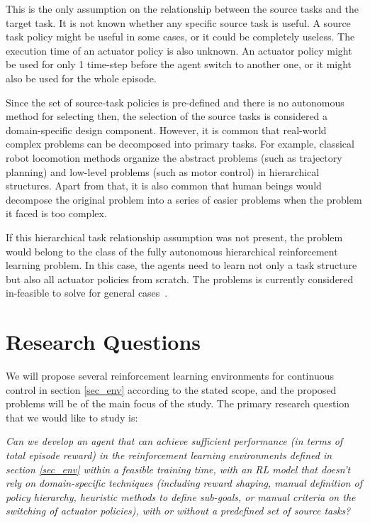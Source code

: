 This is the only assumption on the relationship between the source tasks and the target task. It is not known whether any specific source task is useful. A source task policy might be useful in some cases, or it could be completely useless. The execution time of an actuator policy is also unknown. An actuator policy might be used for only 1 time-step before the agent switch to another one, or it might also be used for the whole episode.

Since the set of source-task policies is pre-defined and there is no autonomous method for selecting then, the selection of the source tasks is considered a domain-specific design component. However, it is common that real-world complex problems can be decomposed into primary tasks. For example, classical robot locomotion methods organize the abstract problems (such as trajectory planning) and low-level problems (such as motor control) in hierarchical structures. Apart from that, it is also common that human beings would decompose the original problem into a series of easier problems when the problem it faced is too complex.

If this hierarchical task relationship assumption was not present, the problem would belong to the class of the fully autonomous hierarchical reinforcement learning problem. In this case, the agents need to learn not only a task structure but also all actuator policies from scratch. The problems is currently considered in-feasible to solve for general cases~\cite{barto2003recent}.


\section{Research Questions}


We will propose several reinforcement learning environments for continuous control in section \ref{sec_env} according to the stated scope, and the proposed problems will be of the main focus of the study.
The primary research question that we would like to study is:

    \textit{Can we develop an agent that can achieve sufficient performance (in terms of total episode reward) in the reinforcement learning environments defined in section \ref{sec_env} within a feasible training time, with an RL model that doesn't rely on domain-specific techniques  (including reward shaping, manual definition of policy hierarchy, heuristic methods to define sub-goals, or manual criteria on the switching of actuator policies), with or without a predefined set of source tasks?}


